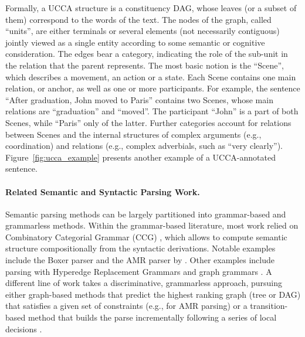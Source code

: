 \documentclass[11pt]{article}
\newcommand{\figref}[1]{Figure~\ref{#1}}
\begin{document}
Formally, a UCCA structure is a constituency DAG, whose leaves (or a subset of them) correspond to the words of the text. The nodes of the graph, called ``units'', are either terminals or several elements (not necessarily contiguous) jointly viewed as a single entity according to some semantic or cognitive consideration. The edges bear a category, indicating the role of the sub-unit in the relation that the parent represents. 
The most basic notion is the ``Scene'', which describes a movement, an action or a state.
Each Scene contains one main relation, or anchor, as well as one or more participants. 
For example, the sentence ``After graduation, John moved to Paris'' contains two Scenes, whose main relations are ``graduation'' and ``moved''. The participant ``John'' is a part of both Scenes, while ``Paris'' only of the latter. Further categories account for relations between Scenes and the internal structures of complex arguments (e.g., coordination) and relations (e.g., complex adverbials, such as ``very clearly'').
\figref{fig:ucca_example} presents another example of a UCCA-annotated sentence. 

\paragraph{Related Semantic and Syntactic Parsing Work.}
Semantic parsing methods can be largely partitioned into grammar-based and grammarless methods.
Within the grammar-based literature, most work relied on Combinatory Categorial Grammar (CCG)
\cite{Steedman:00}, which allows to compute semantic structure compositionally from the
syntactic derivations. Notable examples include the Boxer parser \cite{bos2005towards}
and the AMR parser 
by . Other examples include parsing with Hyperedge Replacement Grammars
\cite{jones2012semantics,chiang2013parsing,peng2015synchronous} and
graph grammars \cite{koller2015semantic}.
A different line of work takes a discriminative, grammarless approach,
pursuing either graph-based methods that predict the highest ranking graph
(tree or DAG) that satisfies a given set of constraints (e.g., 
for AMR parsing)
or a transition-based method that builds the parse incrementally following a series of local
decisions \cite[and much subsequent work]{Nivre03anefficient}.
\end{document}
